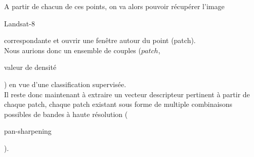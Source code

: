 \documentclass{book}
\begin{document}
A partir de chacun de ces points, on va alors pouvoir récupérer l'image \begin{itshape}Landsat-8\end{itshape}
correspondante et ouvrir une fenêtre autour du point (patch).\\
Nous aurions donc un ensemble de couples ($patch$,\begin{itshape}valeur de densité\end{itshape}) en vue d'une classification supervisée.\\
Il reste donc maintenant à extraire un vecteur descripteur pertinent à partir de chaque patch, chaque patch existant sous forme de multiple combinaisons
possibles de bandes à haute résolution (\begin{itshape}pan-sharpening\end{itshape}).

\backmatter

\listoftables

\listoffigures



\end{document}
